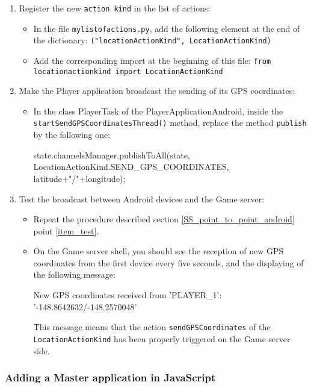 \begin{enumerate}
\item Register the new \texttt{action kind} in the list of actions:

 \begin{itemize}
\item In the file \texttt{mylistofactions.py}, add the following element at the
end of the dictionary:
\newline
\texttt{("locationActionKind", LocationActionKind)}
\item Add the corresponding import at the beginning of this file:
\newline 
\texttt{from locationactionkind import LocationActionKind}
\end{itemize}

\item Make the Player application broadcast the sending of its GPS coordinates:
\begin{itemize}
\item In the class PlayerTask of the PlayerApplicationAndroid, inside the \texttt{startSendGPSCoordinatesThread()} method, replace the method
\texttt{publish} by the following one:
\begin{shellcmd}
state.channelsManager.publishToAll(state,
                                   LocationActionKind.SEND_GPS_COORDINATES, 
                                   latitude+"/"+longitude);
\end{shellcmd}
\end{itemize}
\item Test the broadcast between Android devices and the Game 
server:
\begin{itemize}
\item Repeat the procedure described section \ref{SS_point_to_point_android} 
point \ref{item_test}.
\item On the Game server shell, you should see the reception of new
  GPS coordinates from the first device every five seconds, and the
  displaying of the following message:
\begin{shellcmd}  
[GameLogicServer] New GPS coordinates received from 'PLAYER_1':
'-148.8642632/-148.2570048'
\end{shellcmd}
This message means that the action \texttt{sendGPSCoordinates} of the
\texttt{LocationActionKind} has been properly triggered on the Game
server side.
\end{itemize}

\end{enumerate}


\subsubsection{Adding a Master application in JavaScript}
\label{SS_broadcast_js}

